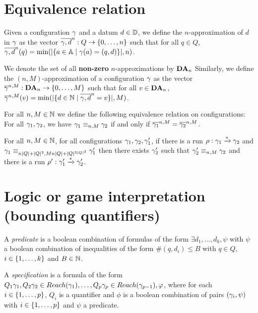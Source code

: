 \documentclass[a4paper,UKenglish,cleveref, autoref, thm-restate]{lipics-v2021}
\begin{document}
	 
	
	\section{Equivalence relation}
	
	Given a configuration $\config$ and a datum $d \in \Dataset$, we define the $n$-approximation of $d$ in $\config$ as the vector $\dataapprox{n}{\config}{d} : Q \to \nset{0}{n}$ such that for all $q\in Q$, $\dataapprox{n}{\config}{d}(q)=\min(\size{\set{a \in \Agentset \mid \config(a)= (q,d)}},n)$.
	
	We denote the set of all \textbf{non-zero} $n$-approximations by $\DataApproxSet{n}$
	Similarly, we define the $(n,M)$-approximation of a configuration $\config$ as the vector $\configapprox{n}{M}{\config} : \DataApproxSet{n} \to \nset{0}{M}$ such that for all $v\in \DataApproxSet{n}$,
	$\configapprox{n}{M}{\config}(v) = \min(\size{\set{d \in \nats \mid \dataapprox{n}{\config}{d} = v}},M)$.
	
	
	For all $n, M \in \nats$ we define the following equivalence relation on configurations: 
	For all $\config_1, \config_2$, we have $\config_1 \equiv_{n,M} \config_2$ if and only if $\configapprox{n}{M}{\config_1} = \configapprox{n}{M}{\config_2}$.
	
	

	\begin{lemma}
		For all $n, M \in \nats$, for all configurations $\config_1, \config_2, \config_1'$, if there is a run $\run : \config_1 \xrightarrow{*} \config_2$ and $\config_1 \equiv_{n\size{Q}+\size{Q}^3,Mn\size{Q}+\size{Q}^{3\size{Q}^3}} \config'_1$ then there exists $\config'_2$ such that $\config'_2 \equiv_{n,M} \config_2$ and there is a run $\run' : \config_1' \xrightarrow{*} \config_2'$.
	\end{lemma}
	
	\section{Logic or game interpretation (bounding quantifiers)}
	
	\begin{definition}
		A \emph{predicate} is a boolean combination of formulas of the form $\exists d_1, \ldots, d_k, \psi$ with $\psi$ a boolean combination of inequalities of the form $\#(q,d_i) \leq B$ with $q\in Q$, $i \in \nset{1}{k}$ and $B \in \nats$.
		
		A \emph{specification} is a formula of the form $Q_1 \config_1, Q_2 \config_2  \in \Reach(\config_1), \ldots, Q_p \config_p \in \Reach(\config_{p-1}), \phi$, where for each $i \in \nset{1}{p}$, $Q_i$ is a quantifier and $\phi$ is a boolean combination of pairs $(\config_i, \psi)$ with $i \in \nset{1}{p}$ and $\psi$ a predicate.
	\end{definition}
\end{document}
